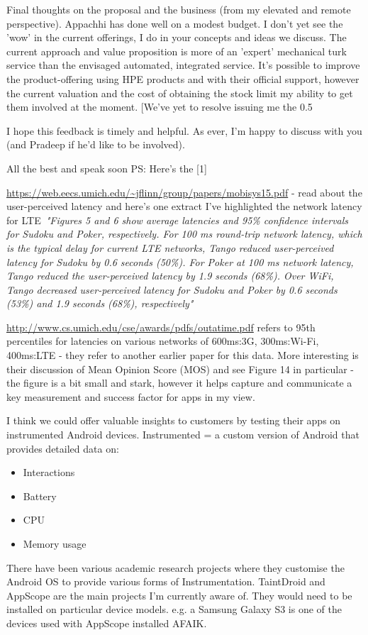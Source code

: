 Final thoughts on the proposal and the business (from my elevated and remote perspective). Appachhi has done well on a modest budget. I don't yet see the 'wow' in the current offerings, I do in your concepts and ideas we discuss. The current approach and value proposition is more of an 'expert' mechanical turk service than the envisaged automated, integrated service. It's possible to improve the product-offering using HPE products and with their official support, however the current valuation and the cost of obtaining the stock limit my ability to get them involved at the moment. [We've yet to resolve issuing me the 0.5%

I hope this feedback is timely and helpful. As ever, I'm happy to discuss with you (and Pradeep if he'd like to be involved).

All the best and speak soon
PS: Here's the [1] 

\url{https://web.eecs.umich.edu/~jflinn/group/papers/mobisys15.pdf} - read about the user-perceived latency and here's one extract I've highlighted the network latency for LTE~\emph{"Figures 5 and 6 show average latencies and 95\% confidence intervals for Sudoku and Poker, respectively. For 100 ms round-trip network latency, which is the typical delay for current LTE networks, Tango reduced user-perceived latency for Sudoku by 0.6 seconds (50\%). For Poker at 100 ms network latency, Tango reduced the user-perceived latency by 1.9 seconds (68\%). Over WiFi, Tango decreased user-perceived latency for Sudoku and Poker by 0.6 seconds (53\%) and 1.9 seconds (68\%), respectively"}

\url{http://www.cs.umich.edu/cse/awards/pdfs/outatime.pdf} refers to 95th percentiles for latencies on various networks of 600ms:3G, 300ms:Wi-Fi, 400ms:LTE - they refer to another earlier paper for this data. More interesting is their discussion of Mean Opinion Score (MOS) and see Figure 14 in particular - the figure is a bit small and stark, however it helps capture and communicate a key measurement and success factor for apps in my view.

I think we could offer valuable insights to customers by testing their apps on instrumented Android devices. Instrumented = a custom version of Android that provides detailed data on:
\begin{itemize}
    \item Interactions
    \item Battery
    \item CPU
    \item Memory usage
\end{itemize}
There have been various academic research projects where they customise the Android OS to provide various forms of Instrumentation. TaintDroid and AppScope are the main projects I'm currently aware of. They would need to be installed on particular device models. e.g. a Samsung Galaxy S3 is one of the devices used with AppScope installed AFAIK.


